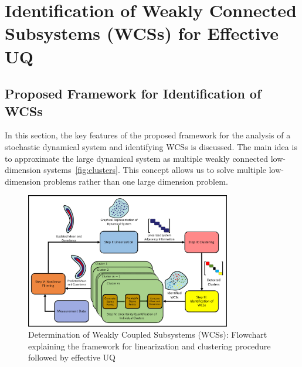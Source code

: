\chapter{Identification of Weakly Connected Subsystems (WCSs) for Effective UQ}
\label{chap:wcs}


\section{Proposed Framework for Identification of WCSs}
\label{framework}

In this section, the key features of the proposed framework for the analysis of a stochastic dynamical system and identifying WCSs is discussed. The main idea is to approximate the large dynamical system as multiple weakly connected low-dimension systems~\ref{fig:clusters}. This concept allows us to solve multiple low-dimension problems rather than one large dimension problem. 

\begin{figure}[H]
        \centering
        \includegraphics[width=0.8\textwidth]{figures/FIG_2}
        \caption{Determination of Weakly Coupled Subsystems (WCSs): Flowchart explaining the framework for linearization and clustering procedure followed by effective UQ}
        \label{fig:UQframework_2}
\end{figure}

